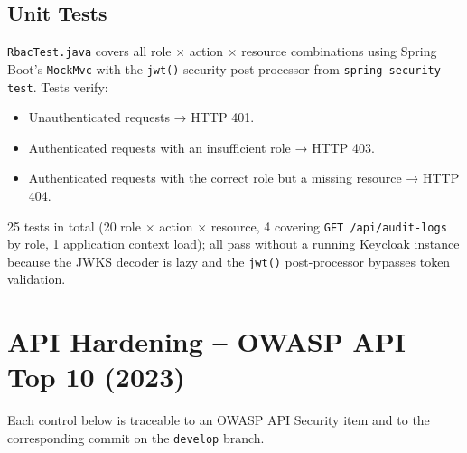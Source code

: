 \documentclass[12pt,a4paper]{report}
\begin{document}
\subsection{Unit Tests}

\texttt{RbacTest.java} covers all role $\times$ action $\times$ resource combinations using
Spring Boot's \texttt{MockMvc} with the \texttt{jwt()} security post-processor from
\texttt{spring-security-test}. Tests verify:

\begin{itemize}
  \item Unauthenticated requests → HTTP 401.
  \item Authenticated requests with an insufficient role → HTTP 403.
  \item Authenticated requests with the correct role but a missing resource → HTTP 404.
\end{itemize}

25 tests in total (20 role $\times$ action $\times$ resource, 4 covering \texttt{GET /api/audit-logs} by role, 1 application context load); all pass without a running Keycloak instance because the JWKS decoder
is lazy and the \texttt{jwt()} post-processor bypasses token validation.

\section{API Hardening -- OWASP API Top 10 (2023)}

Each control below is traceable to an OWASP API Security item and to the corresponding
commit on the \texttt{develop} branch.
\end{document}
